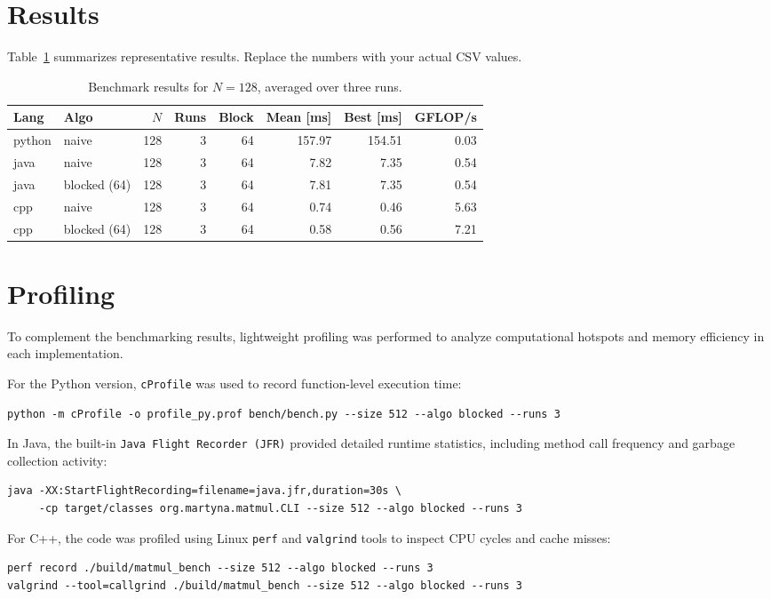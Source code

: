 \documentclass[11pt]{article}
\begin{document}
\section{Results}
Table~\ref{tab:results} summarizes representative results. Replace the numbers with your actual CSV values.

\begin{table}[h]
\centering
\begin{tabular}{l l r r r r r r}
\toprule
Lang & Algo & $N$ & Runs & Block & Mean [ms] & Best [ms] & GFLOP/s \\
\midrule
python & naive        & 128 & 3 & 64 & 157.97 & 154.51 & 0.03 \\
java   & naive        & 128 & 3 & 64 & 7.82 & 7.35 & 0.54 \\
java   & blocked (64) & 128 & 3 & 64 & 7.81 & 7.35 & 0.54 \\
cpp    & naive        & 128 & 3 & 64 & 0.74 & 0.46 & 5.63 \\
cpp    & blocked (64) & 128 & 3 & 64 & 0.58 & 0.56 & 7.21 \\
\bottomrule
\end{tabular}
\caption{Benchmark results for $N=128$, averaged over three runs.}
\label{tab:results}
\end{table}

\section{Profiling}
To complement the benchmarking results, lightweight profiling was performed to analyze computational hotspots and memory efficiency in each implementation. 

For the Python version, \texttt{cProfile} was used to record function-level execution time:
\begin{verbatim}
python -m cProfile -o profile_py.prof bench/bench.py --size 512 --algo blocked --runs 3
\end{verbatim}

In Java, the built-in \texttt{Java Flight Recorder (JFR)} provided detailed runtime statistics, including method call frequency and garbage collection activity:
\begin{verbatim}
java -XX:StartFlightRecording=filename=java.jfr,duration=30s \
     -cp target/classes org.martyna.matmul.CLI --size 512 --algo blocked --runs 3
\end{verbatim}

For C++, the code was profiled using Linux \texttt{perf} and \texttt{valgrind} tools to inspect CPU cycles and cache misses:
\begin{verbatim}
perf record ./build/matmul_bench --size 512 --algo blocked --runs 3
valgrind --tool=callgrind ./build/matmul_bench --size 512 --algo blocked --runs 3
\end{verbatim}
\end{document}
